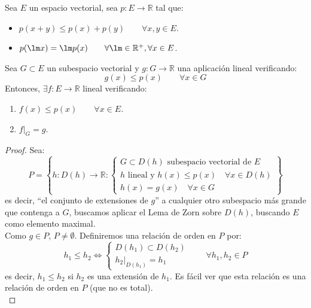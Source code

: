 \begin{teo}
    Sea $E$ un espacio vectorial, sea $p:E\to \mathbb{R}$ tal que: 
    \begin{itemize}
        \item $p(x+y) \leq p(x) + p(y) \qquad \forall x,y\in E$.
        \item $p(\lm x) = \lm p(x) \qquad \forall \lm \in \mathbb{R}^+ ,\forall x\in E$.
    \end{itemize}
    Sea $G\subset E$ un subespacio vectorial y $g:G\to \mathbb{R}$ una aplicación lineal verificando:
    \begin{equation*}
        g(x) \leq p(x) \qquad \forall x\in G
    \end{equation*}
    Entonces, $\exists f:E\to \mathbb{R}$ lineal verificando: 
    \begin{enumerate}
        \item $f(x) \leq p(x) \qquad \forall x\in E$.
        \item $f\big|_G = g$.
    \end{enumerate}
    \begin{proof}
        Sea:
        \begin{equation*}
            P = \left\{h:D(h) \to \mathbb{R} : \left\{\begin{array}{l}
                G\subset D(h) \text{\ subespacio vectorial de\ } E \\
                h \text{\ lineal y\ } h(x) \leq p(x) \quad \forall x\in D(h) \\
                h(x) = g(x) \quad \forall x\in G
            \end{array}\right.\right\}
        \end{equation*}
        es decir, ``el conjunto de extensiones de $g$'' a cualquier otro subespacio más grande que contenga a $G$, buscamos aplicar el Lema de Zorn sobre $D(h)$, buscando $E$ como elemento maximal.\\

        \noindent
        Como $g\in P$, $P\neq \emptyset $. Definiremos una relación de orden en $P$ por:
        \begin{equation*}
            h_1 \leq h_2 \Longleftrightarrow \left\{\begin{array}{l}
                D(h_1) \subset D(h_2) \\
                h_2\big|_{D(h_1)} = h_1
            \end{array}\right. \qquad \forall h_1,h_2\in P
        \end{equation*}
        es decir, $h_1\leq h_2$ si $h_2$ es una extensión de $h_1$. Es fácil ver que esta relación es una relación de orden en $P$ (que no es total).\\ %


\end{proof}
\end{teo}
